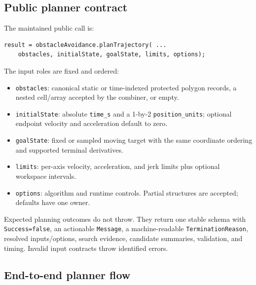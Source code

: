 \documentclass[10pt,letterpaper]{article}
\newcommand{\file}[1]{\nolinkurl{#1}}
\begin{document}
\subsection{Public planner contract}

The maintained public call is:

\begin{lstlisting}
result = obstacleAvoidance.planTrajectory( ...
    obstacles, initialState, goalState, limits, options);
\end{lstlisting}

The input roles are fixed and ordered:

\begin{itemize}
  \item \file{obstacles}: canonical static or time-indexed protected polygon
  records, a nested cell/array accepted by the combiner, or empty.
  \item \file{initialState}: absolute \file{time_s} and a 1-by-2
  \file{position_units}; optional endpoint velocity and acceleration default to
  zero.
  \item \file{goalState}: fixed or sampled moving target with the same
  coordinate ordering and supported terminal derivatives.
  \item \file{limits}: per-axis velocity, acceleration, and jerk limits plus
  optional workspace intervals.
  \item \file{options}: algorithm and runtime controls. Partial structures are
  accepted; defaults have one owner.
\end{itemize}

Expected planning outcomes do not throw. They return one stable schema with
\file{Success=false}, an actionable \file{Message}, a machine-readable
\file{TerminationReason}, resolved inputs/options, search evidence, candidate
summaries, validation, and timing. Invalid input contracts throw identified
errors.

\subsection{End-to-end planner flow}
\end{document}
